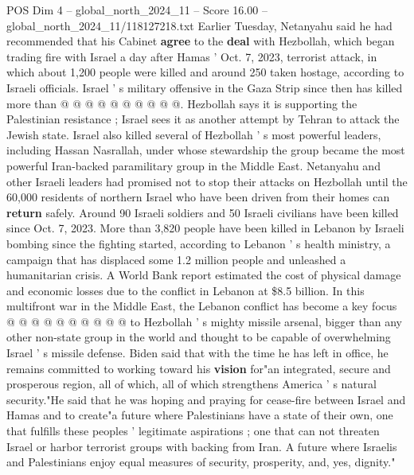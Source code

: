 \begin{textsample}{POS Dim 4 – global\_north\_2024\_11 – Score 16.00 – global\_north\_2024\_11/118127218.txt}
Earlier Tuesday, Netanyahu said he had recommended that his Cabinet \textbf{agree} to the \textbf{deal} with Hezbollah, which began trading fire with Israel a day after Hamas ' Oct. 7, 2023, terrorist attack, in which about 1,200 people were killed and around 250 taken hostage, according to Israeli officials.
Israel ' s military offensive in the Gaza Strip since then has killed more than @ @ @ @ @ @ @ @ @ @.
Hezbollah says it is supporting the Palestinian resistance ; Israel sees it as another attempt by Tehran to attack the Jewish state.
Israel also killed several of Hezbollah ' s most powerful leaders, including Hassan Nasrallah, under whose stewardship the group became the most powerful Iran-backed paramilitary group in the Middle East.
Netanyahu and other Israeli leaders had promised not to stop their attacks on Hezbollah until the 60,000 residents of northern Israel who have been driven from their homes can \textbf{return} safely.
Around 90 Israeli soldiers and 50 Israeli civilians have been killed since Oct. 7, 2023.
More than 3,820 people have been killed in Lebanon by Israeli bombing since the fighting started, according to Lebanon ' s health ministry, a campaign that has displaced some 1.2 million people and unleashed a humanitarian crisis.
A World Bank report estimated the cost of physical damage and economic losses due to the conflict in Lebanon at \$8.5 billion.
In this multifront war in the Middle East, the Lebanon conflict has become a key focus @ @ @ @ @ @ @ @ @ @ to Hezbollah ' s mighty missile arsenal, bigger than any other non-state group in the world and thought to be capable of overwhelming Israel ' s missile defense.
Biden said that with the time he has left in office, he remains committed to working toward his \textbf{vision} for"an integrated, secure and prosperous region, all of which, all of which strengthens America ' s natural security."He said that he was hoping and praying for cease-fire between Israel and Hamas and to create"a future where Palestinians have a state of their own, one that fulfills these peoples ' legitimate aspirations ; one that can not threaten Israel or harbor terrorist groups with backing from Iran.
A future where Israelis and Palestinians enjoy equal measures of security, prosperity, and, yes, dignity."

\end{textsample}
